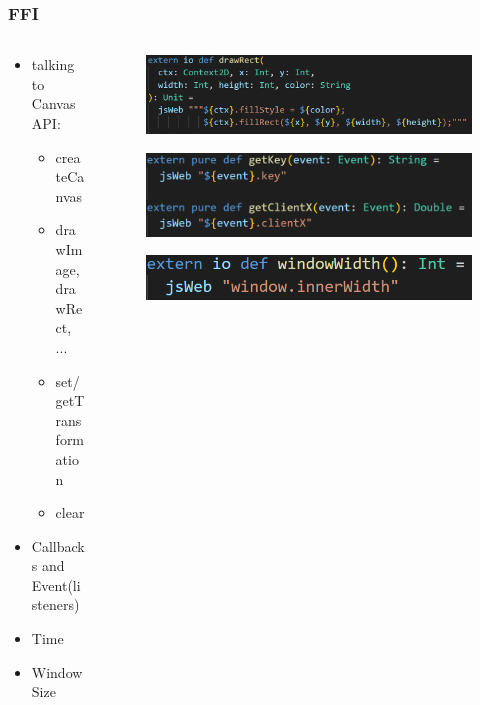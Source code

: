 \documentclass{beamer}
\begin{document}
	\begin{frame}
		\frametitle{FFI}
		\begin{columns}
			\begin{column}{.5\linewidth}
			\begin{itemize}
				\item talking to Canvas API:
				\begin{itemize}
					\item createCanvas
					\item drawImage, drawRect, ...
					\item set/getTransformation
					\item clear
				\end{itemize}
				\item Callbacks and Event(listeners)
				\item Time
				\item Window Size
			\end{itemize}
			\end{column}
			\begin{column}{.5\linewidth}
				\begin{figure}
					\includegraphics[width=\linewidth]{images/drawRect.png}
				\end{figure}
				\begin{figure}
					\includegraphics[width=\linewidth]{images/getKeygetClient.png}
				\end{figure}
				\begin{figure}
					\includegraphics[width=\linewidth]{images/getWindowWidth.png}
				\end{figure}
			\end{column}
		\end{columns}
	\end{frame}
	
\end{document}

